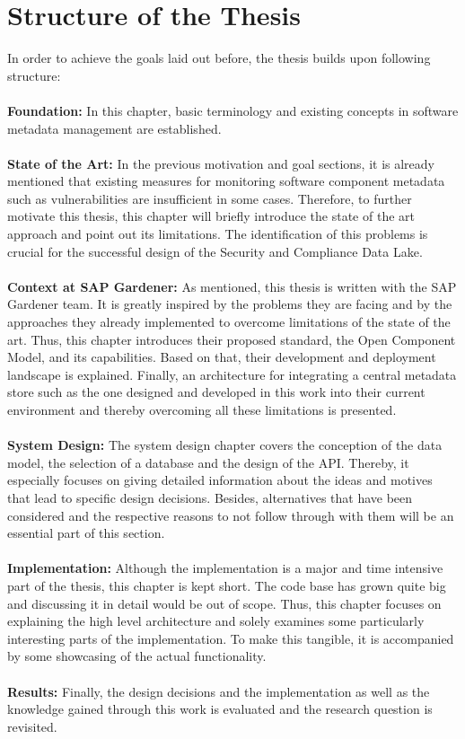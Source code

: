 \section{Structure of the Thesis}
In order to achieve the goals laid out before, the thesis builds upon following structure:\\\\
\textbf{Foundation:} In this chapter, basic terminology and existing concepts in software metadata management are established.\\\\
\textbf{State of the Art:} In the previous motivation and goal sections, it is already mentioned that existing measures for monitoring software component metadata such as vulnerabilities are insufficient in some cases. Therefore, to further motivate this thesis, this chapter will briefly introduce the state of the art approach and point out its limitations. The identification of this problems is crucial for the successful design of the Security and Compliance Data Lake.\\\\
\textbf{Context at SAP Gardener:} As mentioned, this thesis is written with the SAP Gardener team. It is greatly inspired by the problems they are facing and by the approaches they already implemented to overcome limitations of the state of the art. Thus, this chapter introduces their proposed standard, the Open Component Model, and its capabilities. Based on that, their development and deployment landscape is explained. Finally, an architecture for integrating a central metadata store such as the one designed and developed in this work into their current environment and thereby overcoming all these limitations is presented.\\\\
\textbf{System Design:} The system design chapter covers the conception of the data model, the selection of a database and the design of the API. Thereby, it especially focuses on giving detailed information about the ideas and motives that lead to specific design decisions. Besides, alternatives that have been considered and the respective reasons to not follow through with them will be an essential part of this section.\\\\
\textbf{Implementation:} Although the implementation is a major and time intensive part of the thesis, this chapter is kept short. The code base has grown quite big and discussing it in detail would be out of scope. Thus, this chapter focuses on explaining the high level architecture and solely examines some particularly interesting parts of the implementation. To make this tangible, it is accompanied by some showcasing of the actual functionality.\\\\
\textbf{Results:} Finally, the design decisions and the implementation as well as the knowledge gained through this work is evaluated and the research question is revisited.


